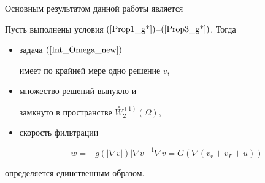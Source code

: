Основным результатом данной работы является





\begin{thmnonum} \label {b21_T}


Пусть выполнены условия $(\ref{Prop1_g*})$--$(\ref{Prop3_g*})$. Тогда


\begin{itemize}


\item[1)] задача $(\ref{Int_Omega_new})$


имеет по крайней мере одно решение $v$,


\item[2)] множество решений выпукло и


замкнуто в пространстве $\overset{\circ}{W}{}^{(1)}_{2}(\Omega)$,


\item[3)] скорость фильтрации


\begin{equation*}




w = -g(|\nabla v|) {|\nabla v|}^{-1} \nabla v


=G(\nabla (v_{r}+v_{\Gamma}+u))


\end{equation*}


\end{itemize}


определяется единственным образом.


\end{thmnonum}





